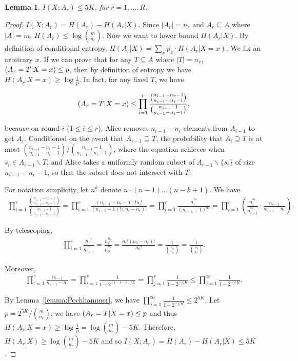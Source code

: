 \documentclass[10pt]{article}
\newtheorem{lemma}{Lemma}
\let\Pr\relax
\DeclareMathOperator*{\Pr}{\mathbb{P}}
\begin{document}
\begin{lemma}\label{lemma:mutual-entropy-bound}
  $I(X;A_r)\le 5K$, for $r=1,\ldots, R$.
\end{lemma}

\begin{proof}
  $I(X;A_r)=H(A_r)-H(A_r|X)$. Since $|A_r|=n_r$ and $A_r\subseteq A$ where $|A|=m$, $H(A_r)\le \log {m \choose n_r}$. Now we want to lower bound $H(A_r|X)$. By definition of conditional entropy, $H(A_r|X)=\sum_x{p_x\cdot H(A_r|X=x)}$. We fix an arbitrary $x$. If we can prove that for any $T\subseteq A$ where $|T|=n_r$, $\Pr(A_r=T|X=x)\le p$, then by definition of entropy we have $H(A_r|X=x)\ge\log\frac{1}{p}$. In fact, for any fixed $T$, we have
  
  \begin{align}
    \Pr(A_r=T|X=x)\le \prod_{i=1}^{r}{\frac{{n_{i-1}-n_r-1 \choose n_{i-1}-n_i-1}}{{n_{i-1}-1 \choose n_{i-1}-n_i-1}}},
  \end{align}
  
  because on round $i$ ($1\le i \le r$), Alice removes $n_{i-1}-n_i$ elements from $A_{i-1}$ to get $A_i$. Conditioned on the event that $A_{i-1}\supseteq T$, the probability that $A_i\supseteq T$ is at most ${{n_{i-1}-n_r-1 \choose n_{i-1}-n_i-1}}/{{n_{i-1}-1 \choose n_{i-1}-n_i-1}}$, where the equation achieves when $s_i\in A_{i-1}\backslash T$, and Alice takes a uniformly random subset of $A_{i-1}\backslash \{s_i\}$ of size $n_{i-1}-n_i-1$, so that the subset does not intersect with $T$.
  
  For notation simplicity, let $n^{\underline{k}}$ denote $n\cdot (n-1)\ldots (n-k+1)$. We have 
  \begin{align}
    \prod_{i=1}^{r}{\frac{{n_{i-1}-n_r-1 \choose n_{i-1}-n_i-1}}{{n_{i-1}-1 \choose n_{i-1}-n_i-1}}}
    =\prod_{i=1}^{r}\frac{(n_{i-1}-n_r-1)!n_i!}{(n_{i-1}-1)!(n_i-n_r)!}
    =\prod_{i=1}^{r}\frac{n_i^{\underline{n_r}}}{(n_{i-1}-1)^{\underline{n_r}}}
    =\prod_{i=1}^{r} \left( \frac{n_i^{\underline{n_r}}}{n_{i-1}^{\underline{n_r}}}\cdot \frac{n_{i-1}}{n_{i-1}-n_r} \right).
  \end{align}
  
  By telescoping,
  \begin{align}
    \prod_{i=1}^{r} \frac{n_i^{\underline{n_r}}}{n_{i-1}^{\underline{n_r}}}
    =\frac{n_r^{\underline{n_r}}}{n_0^{\underline{n_r}}}
    =\frac{n_r!(n_0-n_r)!}{n_0!}=\frac{1}{{n_0 \choose n_r}}
    =\frac{1}{{m \choose n_r}}.
  \end{align}
  
  Moreover, 
  \begin{align}
    \prod_{i=1}^{r} \frac{n_{i-1}}{n_{i-1}-n_r}
    =\prod_{i=1}^{r} \frac{1}{1-2^{(i-1-r)/K}}
    =\prod_{j=1}^{r} \frac{1}{1-2^{-j/K}}
    \le \prod_{j=1}^{\infty} \frac{1}{1-2^{-j/K}}.
  \end{align}
  
  By Lemma~\ref{lemma:Pochhammer}, we have $\prod_{j=1}^{\infty} \frac{1}{1-2^{-j/K}}\le 2^{5K}$. Let $p={2^{5K}}/{{m\choose n_r}}$, we have $\Pr(A_r=T|X=x)\le p$ and thus $H(A_r|X=x)\ge \log\frac{1}{p}=\log{{m\choose n_r}}-5K$. Therefore, $H(A_r|X)\ge \log{{m\choose n_r}}-5K$ and so $I(X;A_r)=H(A_r)-H(A_r|X)\le 5K$.  
\end{proof}
\end{document}
